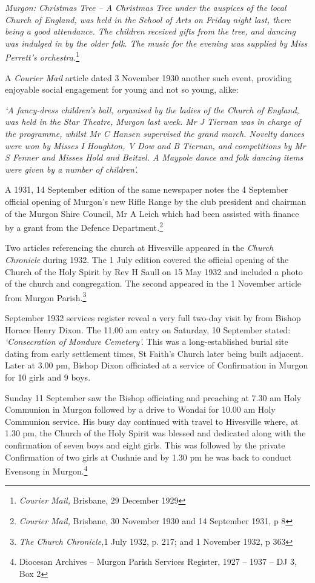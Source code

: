 \emph{Murgon: Christmas Tree -- A Christmas Tree under the auspices of the local Church of England, was held in the School of Arts on Friday night last, there being a good attendance. The children received gifts from the tree, and dancing was indulged in by the older folk. The music for the evening was supplied by Miss Perrett's orchestra.}\footnote{\emph{Courier Mail,} Brisbane, 29 December 1929}


A \emph{Courier Mail} article dated 3 November 1930 another such event, providing enjoyable social engagement for young and not so young, alike:



\emph{`A fancy-dress children's ball, organised by the ladies of the Church of England, was held in the Star Theatre, Murgon last week. Mr J Tiernan was in charge of the programme, whilst Mr C Hansen supervised the grand march. Novelty dances were won by Misses I Houghton, V Dow and B Tiernan, and competitions by Mr S Fenner and Misses Hold and Beitzel. A Maypole dance and folk dancing items were given by a number of children'.}



A 1931, 14 September edition of the same newspaper notes the 4 September official opening of Murgon's new Rifle Range by the club president and chairman of the Murgon Shire Council, Mr A Leich which had been assisted with finance by a grant from the Defence Department\emph{.}\footnote{\emph{Courier Mail,} Brisbane, 30 November 1930 and 14 September 1931, p 8}


Two articles referencing the church at Hivesville appeared in the \emph{Church Chronicle} during 1932. The 1 July edition covered the official opening of the Church of the Holy Spirit by Rev H Saull on 15 May 1932 and included a photo of the church and congregation. The second appeared in the 1 November article from Murgon Parish.\footnote{\emph{The Church Chronicle,}1 July 1932, p. 217; and 1 November 1932, p 363}


September 1932 services register reveal a very full two-day visit by from Bishop Horace Henry Dixon. The 11.00 am entry on Saturday, 10 September stated: \emph{`Consecration of Mondure Cemetery'.} This was a long-established burial site dating from early settlement times, St Faith's Church later being built adjacent. Later at 3.00 pm, Bishop Dixon officiated at a service of Confirmation in Murgon for 10 girls and 9 boys.



Sunday 11 September saw the Bishop officiating and preaching at 7.30 am Holy Communion in Murgon followed by a drive to Wondai for 10.00 am Holy Communion service. His busy day continued with travel to Hivesville where, at 1.30 pm, the Church of the Holy Spirit was blessed and dedicated along with the confirmation of seven boys and eight girls. This was followed by the private Confirmation of two girls at Cushnie and by 1.30 pm he was back to conduct Evensong in Murgon.\footnote{Diocesan Archives -- Murgon Parish Services Register, 1927 -- 1937 -- DJ 3, Box 2}


